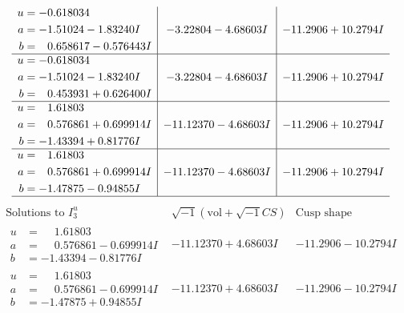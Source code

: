 \documentclass[1p]{elsarticle_modified}
\theoremstyle{definition}
\newcommand{\I}{\sqrt{-1}}
\begin{document}
$$\begin{array}{c|c|c}
\begin{aligned}
u &= -0.618034\phantom{ +0.000000I} \\
a &= -1.51024 - 1.83240 I \\
b &= \phantom{-}0.658617 - 0.576443 I\end{aligned}
 & -3.22804 - 4.68603 I & -11.2906 + 10.2794 I \\ \hline\begin{aligned}
u &= -0.618034\phantom{ +0.000000I} \\
a &= -1.51024 - 1.83240 I \\
b &= \phantom{-}0.453931 + 0.626400 I\end{aligned}
 & -3.22804 - 4.68603 I & -11.2906 + 10.2794 I \\ \hline\begin{aligned}
u &= \phantom{-}1.61803\phantom{ +0.000000I} \\
a &= \phantom{-}0.576861 + 0.699914 I \\
b &= -1.43394 + 0.81776 I\end{aligned}
 & -11.12370 - 4.68603 I & -11.2906 + 10.2794 I \\ \hline\begin{aligned}
u &= \phantom{-}1.61803\phantom{ +0.000000I} \\
a &= \phantom{-}0.576861 + 0.699914 I \\
b &= -1.47875 - 0.94855 I\end{aligned}
 & -11.12370 - 4.68603 I & -11.2906 + 10.2794 I\\
 \hline 
 \end{array}$$\newpage$$\begin{array}{c|c|c}  
\text{Solutions to }I^u_{3}& \I (\text{vol} + \sqrt{-1}CS) & \text{Cusp shape}\\
 \hline 
\begin{aligned}
u &= \phantom{-}1.61803\phantom{ +0.000000I} \\
a &= \phantom{-}0.576861 - 0.699914 I \\
b &= -1.43394 - 0.81776 I\end{aligned}
 & -11.12370 + 4.68603 I & -11.2906 - 10.2794 I \\ \hline\begin{aligned}
u &= \phantom{-}1.61803\phantom{ +0.000000I} \\
a &= \phantom{-}0.576861 - 0.699914 I \\
b &= -1.47875 + 0.94855 I\end{aligned}
 & -11.12370 + 4.68603 I & -11.2906 - 10.2794 I \\ \hline\begin{aligned}

\end{aligned}
\end{array}$$
\end{document}
